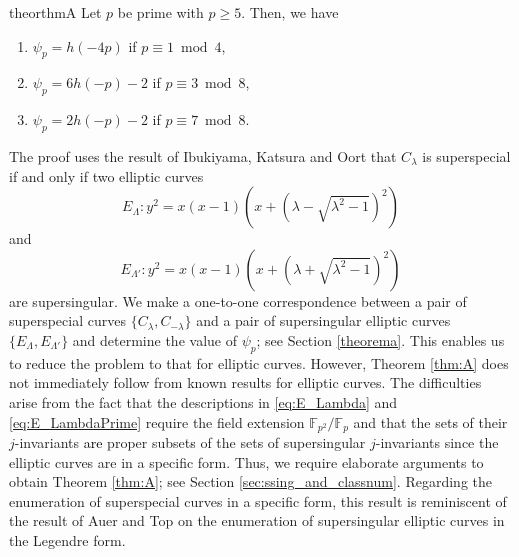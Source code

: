 \documentclass[10pt,a4paper]{amsart}
\theoremstyle{plain}
\newtheorem*{thm*}{Theorem}
\newcommand{\lm}{\lambda}
\newcommand{\Lm}{\Lambda}
\begin{document}
\begin{restatable}{theor}{thmA} \label{thm:A}
Let $p$ be prime with $p \ge 5$. Then, we have
   \begin{enumerate}
        \item[(1)] ${\psi}_{p}=h(-4p)$ if $p \equiv 1 \bmod 4$,
        \item[(2)] ${\psi}_{p}=6h(-p)-2$ if $p \equiv 3 \bmod 8$,
        \item[(3)] ${\psi}_{p}=2h(-p)-2$ if $p \equiv 7 \bmod 8$.
    \end{enumerate}
\end{restatable}   

 The proof uses the result of Ibukiyama, Katsura and Oort \cite[\S 1.2]{IKO02} that $C_{\lm}$ is superspecial if and only if two elliptic curves 
 \begin{equation}\label{eq:E_Lambda}
     E_{\Lm}:y^2=x(x-1)\left(x+(\lm - \sqrt{{\lm}^2-1})^2 \right)
 \end{equation}
 and 
\begin{equation}\label{eq:E_LambdaPrime}
 E_{{\Lm}'}:y^2=x(x-1)\left(x+(\lm +\sqrt{{\lm}^2-1})^2 \right)
 \end{equation}
 are supersingular. We make a one-to-one correspondence between a pair of superspecial curves $\{C_{\lm},C_{-\lm}\}$ and a pair of supersingular elliptic curves $\{ E_{\Lm},E_{{\Lm}'}\}$ and determine the value of ${\psi}_{p}$; see Section \ref{theorema}. This enables us to reduce the problem to that for elliptic curves.
However,
Theorem \ref{thm:A} does not immediately follow from known results for elliptic curves. The difficulties arise from the fact that the descriptions in \eqref{eq:E_Lambda} and \eqref{eq:E_LambdaPrime} require the field extension $\mathbb F_{p^2}/\mathbb F_{p}$ and that the set\textcolor{black}{s} of their $j$-invariants \textcolor{black}{are} proper subset\textcolor{black}{s} of the set\textcolor{black}{s} of supersingular $j$-invariants since the elliptic curves are in a specific form.
Thus, we require elaborate arguments to obtain Theorem \ref{thm:A}; see Section \ref{sec:ssing_and_classnum}. Regarding the enumeration of superspecial curves in a specific form, this result is reminiscent of the result of Auer and Top \cite[Proposition 3.2]{AT02} on the enumeration of supersingular elliptic curves in the Legendre form. 
\end{document}
